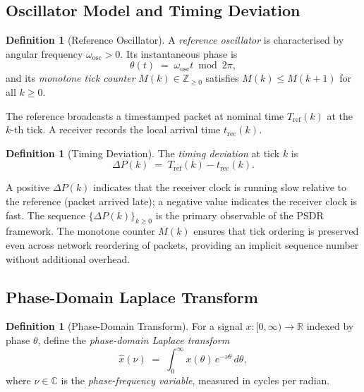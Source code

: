 \documentclass[10pt,twocolumn]{article}
\theoremstyle{plain}
\theoremstyle{definition}
\newtheorem{definition}[theorem]{Definition}
\theoremstyle{remark}
\newcommand{\R}{\mathbb{R}}
\newcommand{\Z}{\mathbb{Z}}
\newcommand{\DeltaP}{\Delta P}
\newcommand{\omegaosc}{\omega_{\mathrm{osc}}}
\newcommand{\Tref}{T_{\mathrm{ref}}}
\newcommand{\trec}{t_{\mathrm{rec}}}
\begin{document}
\subsection{Oscillator Model and Timing Deviation}
\label{ssec:oscillator}

\begin{definition}[Reference Oscillator]
\label{def:osc}
A \emph{reference oscillator} is characterised by angular frequency
$\omegaosc > 0$.  Its instantaneous phase is
\begin{equation}
  \theta(t) \;=\; \omegaosc t \bmod 2\pi,
  \label{eq:phase}
\end{equation}
and its \emph{monotone tick counter} $M(k) \in \Z_{\geq 0}$ satisfies
$M(k) \leq M(k+1)$ for all $k \geq 0$.
\end{definition}

The reference broadcasts a timestamped packet at nominal time
$\Tref(k)$ at the $k$-th tick.  A receiver records the local arrival
time $\trec(k)$.

\begin{definition}[Timing Deviation]
\label{def:deltaP}
The \emph{timing deviation} at tick $k$ is
\begin{equation}
  \DeltaP(k) \;=\; \Tref(k) - \trec(k).
  \label{eq:deltaP}
\end{equation}
\end{definition}

A positive $\DeltaP(k)$ indicates that the receiver clock is running
slow relative to the reference (packet arrived late); a negative value
indicates the receiver clock is fast.  The sequence
$\{\DeltaP(k)\}_{k \geq 0}$ is the primary observable of the PSDR
framework.  The monotone counter $M(k)$ ensures that tick ordering is
preserved even across network reordering of packets, providing an
implicit sequence number without additional overhead.

\subsection{Phase-Domain Laplace Transform}
\label{ssec:phaselaplace}

\begin{definition}[Phase-Domain Transform]
\label{def:pdlt}
For a signal $x : [0,\infty) \to \R$ indexed by phase $\theta$, define
the \emph{phase-domain Laplace transform}
\begin{equation}
  \hat{x}(\nu) \;=\; \int_0^\infty x(\theta)\,e^{-\nu\theta}\,d\theta,
  \label{eq:pdlt}
\end{equation}
where $\nu \in \mathbb{C}$ is the \emph{phase-frequency variable},
measured in cycles per radian.
\end{definition}
\end{document}
